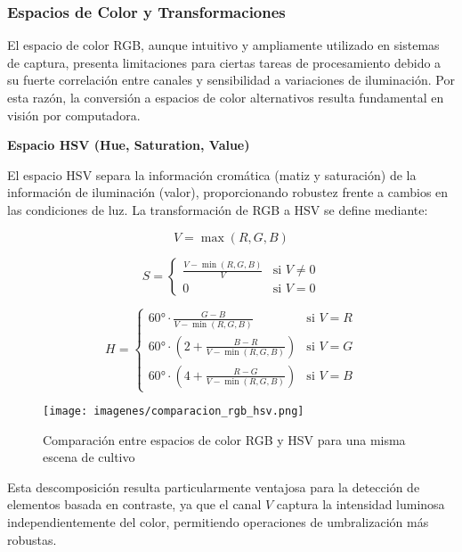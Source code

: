 \subsubsection{Espacios de Color y Transformaciones}

El espacio de color RGB, aunque intuitivo y ampliamente utilizado en sistemas de captura, presenta limitaciones para ciertas tareas de procesamiento debido a su fuerte correlación entre canales y sensibilidad a variaciones de iluminación. Por esta razón, la conversión a espacios de color alternativos resulta fundamental en visión por computadora.

\textbf{Espacio HSV (Hue, Saturation, Value)}

El espacio HSV separa la información cromática (matiz y saturación) de la información de iluminación (valor), proporcionando robustez frente a cambios en las condiciones de luz. La transformación de RGB a HSV se define mediante:

\begin{equation}
V = \max(R, G, B)
\end{equation}

\begin{equation}
S = \begin{cases}
\frac{V - \min(R,G,B)}{V} & \text{si } V \neq 0 \\
0 & \text{si } V = 0
\end{cases}
\end{equation}

\begin{equation}
H = \begin{cases}
60° \cdot \frac{G-B}{V - \min(R,G,B)} & \text{si } V = R \\
60° \cdot \left(2 + \frac{B-R}{V - \min(R,G,B)}\right) & \text{si } V = G \\
60° \cdot \left(4 + \frac{R-G}{V - \min(R,G,B)}\right) & \text{si } V = B
\end{cases}
\end{equation}

\begin{figure}[h]
\centering
\texttt{[image: imagenes/comparacion\_rgb\_hsv.png]}
\caption{Comparación entre espacios de color RGB y HSV para una misma escena de cultivo}
\label{fig:comparacion_rgb_hsv}
\end{figure}

Esta descomposición resulta particularmente ventajosa para la detección de elementos basada en contraste, ya que el canal $V$ captura la intensidad luminosa independientemente del color, permitiendo operaciones de umbralización más robustas.


